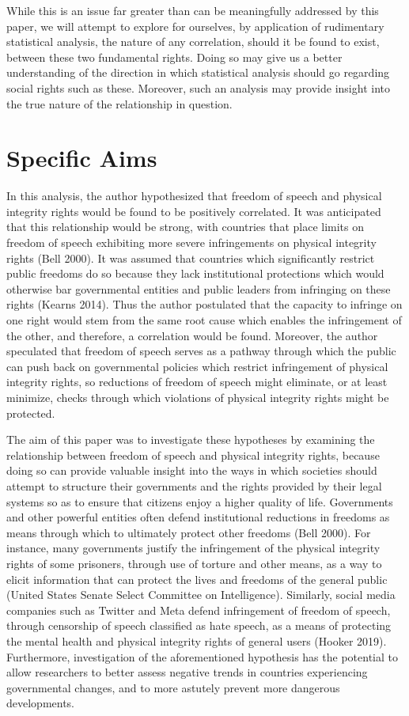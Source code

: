 \documentclass{article}
\begin{document}
While this is an issue far greater than can be meaningfully addressed by this paper, we will attempt to explore for ourselves, by application of rudimentary statistical analysis, the nature of any correlation, should it be found to exist, between these two fundamental rights. Doing so may give us a better understanding of the direction in which statistical analysis should go regarding social rights such as these. Moreover, such an analysis may provide insight into the true nature of the relationship in question. 

\section{Specific Aims}
In this analysis, the author hypothesized that freedom of speech and physical integrity rights would be found to be positively correlated. It was anticipated that this relationship would be strong, with countries that place limits on freedom of speech exhibiting more severe infringements on physical integrity rights (Bell 2000). It was assumed that countries which significantly restrict public freedoms do so because they lack institutional protections which would otherwise bar governmental entities and public leaders from infringing on these rights (Kearns 2014). Thus the author postulated that the capacity to infringe on one right would stem from the same root cause which enables the infringement of the other, and therefore, a correlation would be found. Moreover, the author speculated that freedom of speech serves as a pathway through which the public can push back on governmental policies which restrict infringement of physical integrity rights, so reductions of freedom of speech might eliminate, or at least minimize, checks through which violations of physical integrity rights might be protected. 

The aim of this paper was to investigate these hypotheses by examining the relationship between freedom of speech and physical integrity rights, because doing so can provide valuable insight into the ways in which societies should attempt to structure their governments and the rights provided by their legal systems so as to ensure that citizens enjoy a higher quality of life. Governments and other powerful entities often defend institutional reductions in freedoms as means through which to ultimately protect other freedoms (Bell 2000). For instance, many governments justify the infringement of the physical integrity rights of some prisoners, through use of torture and other means, as a way to elicit information that can protect the lives and freedoms of the general public (United States Senate Select Committee on Intelligence). Similarly, social media companies such as Twitter and Meta defend infringement of freedom of speech, through censorship of speech classified as hate speech, as a means of protecting the mental health and physical integrity rights of general users (Hooker 2019). Furthermore, investigation of the aforementioned hypothesis has the potential to allow researchers to better assess negative trends in countries experiencing governmental changes, and to more astutely prevent more dangerous developments.
\end{document}
